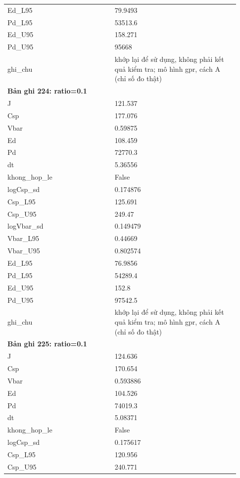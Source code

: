 \begin{longtable}{p{0.43\linewidth}p{0.50\linewidth}}
Ed\_\allowbreak L95 & 79.9493 \\
Pd\_\allowbreak L95 & 53513.6 \\
Ed\_\allowbreak U95 & 158.271 \\
Pd\_\allowbreak U95 & 95668 \\
ghi\_\allowbreak chu & khớp lại để sử dụng, không phải kết quả kiểm tra; mô hình gpr, cách A (chỉ số đo thật) \\
\midrule
\multicolumn{2}{p{0.95\linewidth}}{\textbf{Bản ghi 224: ratio=0.1}} \\
J & 121.537 \\
Csp & 177.076 \\
Vbar & 0.59875 \\
Ed & 108.459 \\
Pd & 72770.3 \\
dt & 5.36556 \\
khong\_\allowbreak hop\_\allowbreak le & False \\
logCsp\_\allowbreak sd & 0.174876 \\
Csp\_\allowbreak L95 & 125.691 \\
Csp\_\allowbreak U95 & 249.47 \\
logVbar\_\allowbreak sd & 0.149479 \\
Vbar\_\allowbreak L95 & 0.44669 \\
Vbar\_\allowbreak U95 & 0.802574 \\
Ed\_\allowbreak L95 & 76.9856 \\
Pd\_\allowbreak L95 & 54289.4 \\
Ed\_\allowbreak U95 & 152.8 \\
Pd\_\allowbreak U95 & 97542.5 \\
ghi\_\allowbreak chu & khớp lại để sử dụng, không phải kết quả kiểm tra; mô hình gpr, cách A (chỉ số đo thật) \\
\midrule
\multicolumn{2}{p{0.95\linewidth}}{\textbf{Bản ghi 225: ratio=0.1}} \\
J & 124.636 \\
Csp & 170.654 \\
Vbar & 0.593886 \\
Ed & 104.526 \\
Pd & 74019.3 \\
dt & 5.08371 \\
khong\_\allowbreak hop\_\allowbreak le & False \\
logCsp\_\allowbreak sd & 0.175617 \\
Csp\_\allowbreak L95 & 120.956 \\
Csp\_\allowbreak U95 & 240.771 \\

\end{longtable}
